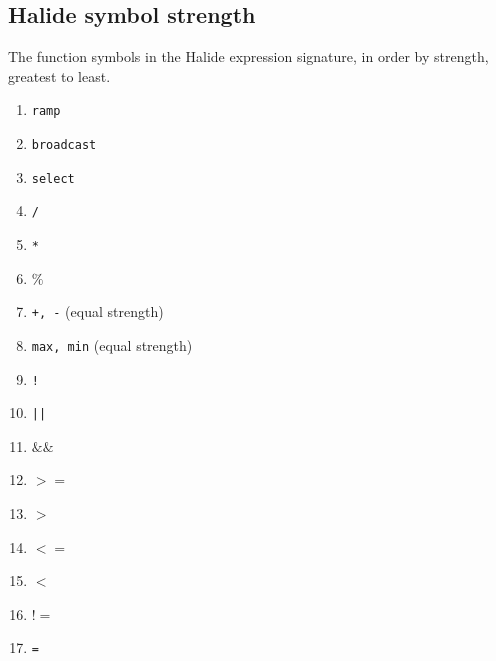\documentclass[sigplan,10pt,review,anonymous]{acmart}\settopmatter{printfolios=true,printccs=false,printacmref=false}
\begin{document}
\subsection{Halide symbol strength} \label{symbolstrength}

The function symbols in the Halide expression signature, in order by strength, greatest to least.

\begin{enumerate}
  \item \texttt{ramp}
  \item \texttt{broadcast}
  \item \texttt{select}
  \item \texttt{/}
  \item \texttt{*}
  \item \texttt{$\%$}
  \item \texttt{+, -} (equal strength)
  \item \texttt{max, min} (equal strength)
  \item \texttt{!}
  \item \texttt{||}
  \item \texttt{$\&\&$}
  \item \texttt{$>=$}
  \item \texttt{$>$}
  \item \texttt{$<=$}
  \item \texttt{$<$}
  \item \texttt{$!=$}
  \item \texttt{=}
\end{enumerate}
\end{document}

